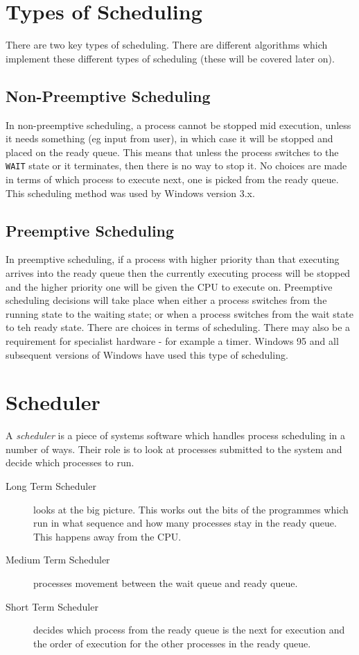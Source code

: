 \section*{Types of Scheduling}
There are two key types of scheduling. There are different algorithms which implement these different types of scheduling (these will be covered later on).
\subsection*{Non-Preemptive Scheduling}
In non-preemptive scheduling, a process cannot be stopped mid execution, unless it needs something (eg input from user), in which case it will be stopped and placed on the ready queue. This means that unless the process switches to the \verb|WAIT| state or it terminates, then there is no way to stop it. No choices are made in terms of which process to execute next, one is picked from the ready queue. This scheduling method was used by Windows version 3.x.

\subsection*{Preemptive Scheduling}
In preemptive scheduling, if a process with higher priority than that executing arrives into the ready queue then the currently executing process will be stopped and the higher priority one will be given the CPU to execute on. Preemptive scheduling decisions will take place when either a process switches from the running state to the waiting state; or when a process switches from the wait state to teh ready state. There are choices in terms of scheduling. There may also be a requirement for specialist hardware - for example a timer. Windows 95 and all subsequent versions of Windows have used this type of scheduling. 

\section*{Scheduler}
A \textit{scheduler} is a piece of systems software which handles process scheduling in a number of ways. Their role is to look at processes submitted to the system and decide which processes to run. 
\begin{description}
    \item[Long Term Scheduler] looks at the big picture. This works out the bits of the programmes which run in what sequence and how many processes stay in the ready queue. This happens away from the CPU. 
    \item[Medium Term Scheduler] processes movement between the wait queue and ready queue.
    \item[Short Term Scheduler] decides which process from the ready queue is the next for execution and the order of execution for the other processes in the ready queue. 
\end{description}

